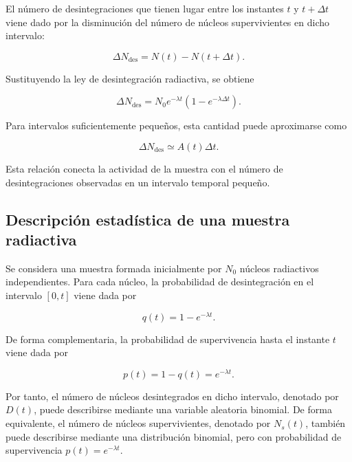 \documentclass[12pt,a4paper]{article}
\begin{document}
El número de desintegraciones que tienen lugar entre los instantes $t$ y $t+\Delta t$ viene dado por la disminución del número de núcleos supervivientes en dicho intervalo:

\begin{equation}
    \Delta N_{\text{des}}=N(t)-N(t+\Delta t).
\end{equation}

Sustituyendo la ley de desintegración radiactiva, se obtiene

\begin{equation}
    \Delta N_{\text{des}}
    =
    N_0 e^{-\lambda t}\left(1-e^{-\lambda \Delta t}\right).
    \label{eq:desintegraciones_intervalo}
\end{equation}

Para intervalos suficientemente pequeños, esta cantidad puede aproximarse como

\begin{equation}
    \Delta N_{\text{des}}\simeq A(t)\Delta t.
\end{equation}

Esta relación conecta la actividad de la muestra con el número de desintegraciones observadas en un intervalo temporal pequeño.


\subsection{Descripción estadística de una muestra radiactiva}

Se considera una muestra formada inicialmente por $N_0$ núcleos radiactivos independientes. Para cada núcleo, la probabilidad de desintegración en el intervalo $[0,t]$ viene dada por

\begin{equation}
    q(t)=1-e^{-\lambda t}.
    \label{eq:prob_desintegracion_t}
\end{equation}

De forma complementaria, la probabilidad de supervivencia hasta el instante $t$ viene dada por

\begin{equation}
    p(t)=1-q(t)=e^{-\lambda t}.
    \label{eq:prob_supervivencia_t}
\end{equation}

Por tanto, el número de núcleos desintegrados en dicho intervalo, denotado por $D(t)$, puede describirse mediante una variable aleatoria binomial. De forma equivalente, el número de núcleos supervivientes, denotado por $N_s(t)$, también puede describirse mediante una distribución binomial, pero con probabilidad de supervivencia $p(t)=e^{-\lambda t}$.
\end{document}

